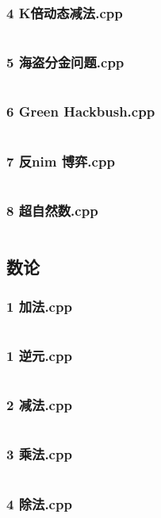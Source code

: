 \documentclass[a4paper,11pt]{article}
\begin{document}
\subsubsection{4 K倍动态减法.cpp}
\inputminted[breaklines]{c++}{"D:/tmplz/templates/数学/博弈/4 K倍动态减法.cpp"}
\subsubsection{5 海盗分金问题.cpp}
\inputminted[breaklines]{c++}{"D:/tmplz/templates/数学/博弈/5 海盗分金问题.cpp"}
\subsubsection{6 Green Hackbush.cpp}
\inputminted[breaklines]{c++}{"D:/tmplz/templates/数学/博弈/6 Green Hackbush.cpp"}
\subsubsection{7 反nim 博弈.cpp}
\inputminted[breaklines]{c++}{"D:/tmplz/templates/数学/博弈/7 反nim 博弈.cpp"}
\subsubsection{8 超自然数.cpp}
\inputminted[breaklines]{c++}{"D:/tmplz/templates/数学/博弈/8 超自然数.cpp"}
\subsection{数论}
\subsubsection{1 加法.cpp}
\inputminted[breaklines]{c++}{"D:/tmplz/templates/数学/数论/1 加法.cpp"}
\subsubsection{1 逆元.cpp}
\inputminted[breaklines]{c++}{"D:/tmplz/templates/数学/数论/1 逆元.cpp"}
\subsubsection{2 减法.cpp}
\inputminted[breaklines]{c++}{"D:/tmplz/templates/数学/数论/2 减法.cpp"}
\subsubsection{3 乘法.cpp}
\inputminted[breaklines]{c++}{"D:/tmplz/templates/数学/数论/3 乘法.cpp"}
\subsubsection{4 除法.cpp}
\inputminted[breaklines]{c++}{"D:/tmplz/templates/数学/数论/4 除法.cpp"}
\end{document}
